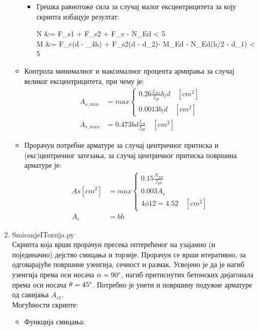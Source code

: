 \documentclass[11pt, a4paper]{article}
\begin{document}
\begin{enumerate}
\begin{itemize}
\begin{itemize}
 			\item Грешка равнотоже сила за случај малог ексцентрицитета за коју скрипта избацује резултат:
 				\begin{flalign*}
 				\Delta N &= F_{s1} + F_{s2} + F_{c} - N_{Ed} < 5 \quad [kN] \\
 				\Delta M &= F_c(d - \beta_4h) + F_{s2}(d - d_2)- M_{Ed} - N_{Ed}(h/2 - d_1) < 5 \quad [kNm]
 				\end{flalign*}
 		\end{itemize}

		\item Контрола минималног и максималног процента армирања за случај великог ексцентрицитета, при чему је:
		\begin{align*}
			A_{s,min} &= max \left\{\begin{array}{l}
				0.26\frac{f_{ctm}}{f_{yk}}b_{t}d \quad [cm^2] \\[4mm]
				0.0013b_{t}d	 \quad [cm^2]		
			\end{array} \right.\\
			A_{s,max} &= 0.473bd\frac{f_{cd}}{f_{yd}} \quad [cm^2]
		\end{align*}

\item Прорачун потребне арматуре за случај центричног притиска и  (екс)центричног затезања, за случај центричног притиска површина арматуре је:\\

\begin{align*}
As[cm^2] &= max \left\{\begin{array}{l}
0.15 \frac{N_{Ed}}{f_{yd}} \\
0.003A_c \\
4 \phi 12 = 4.52 \quad [cm^2]
\end{array} \right.\\
A_c &= bh
\end{align*}

	
\end{itemize}
	
	\item {\LARGE {SmicanjeITorzija.py}} \\[5mm]
	Скрипта која врши прорачун пресека оптерећеног на узајамно (и појединачно) дејство смицања и торзије. Прорачун се врши итеративно, за одговарајуће површине узенгија, сечност и размак. Усвојено је да је нагиб узенгија према оси носача $\alpha = 90\degree$, нагиб притиснутих бетонских дијагонала према оси носача $\theta = 45\degree$. Потребно је унети и површину подужне арматуре од савијања $A_{s1}$.\\[4mm]
	Могућности скрипте:
	\begin{itemize}
		\item Функција смицања:
		\begin{itemize}
		

\end{itemize}
\end{itemize}
\end{enumerate}
\end{document}

